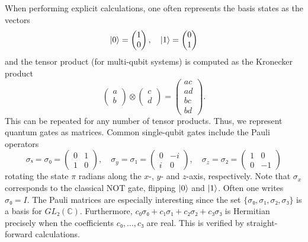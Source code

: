 When performing explicit calculations, one often represents the basis states as the vectors
\begin{equation}
  \lvert0\rangle = \begin{pmatrix} 1 \\ 0\end{pmatrix}, \quad \lvert1\rangle = \begin{pmatrix} 0 \\ 1 \end{pmatrix}
\end{equation}
and the tensor product (for multi-qubit systems) is computed as the Kronecker product
\begin{equation}
  \begin{pmatrix} a \\ b \end{pmatrix} \otimes \begin{pmatrix} c \\ d \end{pmatrix}
  = \begin{pmatrix} ac \\ ad \\ bc \\ bd \end{pmatrix}.
\end{equation}
This can be repeated for any number of tensor products. Thus, we represent quantum gates as matrices. Common single-qubit gates include the Pauli operators
\begin{equation}
  σₓ  = σ₀ = \begin{pmatrix} 0 & 1 \\ 1 & 0 \end{pmatrix}, \quad
  σ_y = σ₁ = \begin{pmatrix} 0 & -i \\ i & 0 \end{pmatrix}, \quad
  σ_z = σ₂ = \begin{pmatrix} 1 & 0 \\ 0 & -1 \end{pmatrix}
\end{equation}
rotating the state $\pi$ radians along the $x$-, $y$- and $z$-axis, respectively. Note that $\sigma_x$ corresponds to the classical NOT gate, flipping $\lvert0\rangle$ and $\lvert1\rangle$. Often one writes $σ₀ = I$. The Pauli matrices are especially interesting since the set $\{σ₀,σ₁,σ₂,σ₃\}$ is a basis for $GL₂(ℂ)$. Furthermore, $c₀σ₀ + c₁σ₁ + c₂σ₂ + c₃σ₃$ is Hermitian precisely when the coefficients $c₀,…,c₃$ are real. This is verified by straight-forward calculations.

